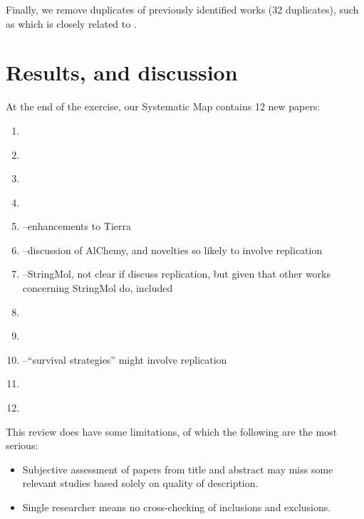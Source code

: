 
Finally, we remove duplicates of previously identified works (32 duplicates), such as \cite{smFaulconbridgeStepneyMillerEtAl2011} which is closely related to \cite{Faulconbridge2011, Faulconbridge2010}.

\section{Results, and discussion}

At the end of the exercise, our Systematic Map contains 12 new papers:
\begin{enumerate}
\item \cite{smAdamsLipson2003}
\item \cite{smBobrikKvasnickaPospichal2008a}
\item \cite{smBobrikKvasnickaPospichal2008}
\item \cite{smEllabaan2007}
\item \cite{smSugiuraSuzukiShioseEtAl2003}--enhancements to Tierra
\item \cite{smFenizioMatsumaruDittrich2011}--discussion of AlChemy, and novelties so likely to involve replication
\item \cite{smHickinbothamClarkNellisEtAl2016}--StringMol, not clear if discuss replication, but given that other works concerning StringMol do, included
\item \cite{smHinzeFaslerLenserEtAl2009}
\item \cite{smSuzuki2003a}
\item \cite{smBanzhafDittrichEller1999}--``survival strategies'' might involve replication
\item \cite{smGordon-Smith2011}
\item \cite{smGohEweGoh2014}
\end{enumerate}

This review does have some limitations, of which the following are the most serious:
\begin{itemize}
	\item Subjective assessment of papers from title and abstract may miss some relevant studies based solely on quality of description.
	\item Single researcher means no cross-checking of inclusions and exclusions.
\end{itemize}